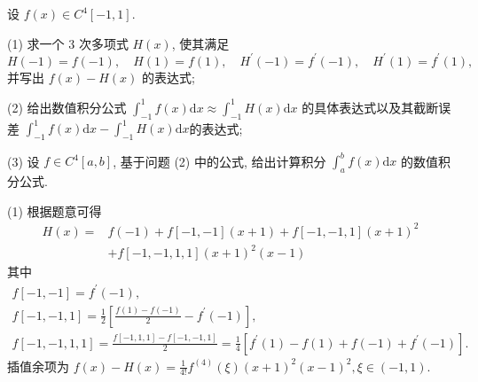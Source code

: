 \begin{tcolorbox}[enhanced,colback=10,colframe=9,breakable,coltitle=green!25!black,title=2024]
设 $ f(x) \in C^{4}[-1,1] $.

(1) 求一个 3 次多项式 $ H(x) $, 使其满足
$$
H(-1)=f(-1), \quad H(1)=f(1), \quad H^{\prime}(-1)=f^{\prime}(-1), \quad H^{\prime}(1)=f^{\prime}(1),
$$
并写出 $ f(x)-H(x) $ 的表达式;

(2) 给出数值积分公式 $\displaystyle\int_{-1}^{1} f(x) \mathrm{d} x \approx \int_{-1}^{1} H(x) \mathrm{d} x $ 的具体表达式以及其截断误差
$\displaystyle\int_{-1}^{1} f(x) \mathrm{d} x-\int_{-1}^{1} H(x) \mathrm{d} x$的表达式;

(3) 设 $ f \in C^{4}[a, b] $, 基于问题 (2) 中的公式, 给出计算积分 $ \int_{a}^{b} f(x) \mathrm{d} x $ 的数值积分公式.
\tcblower

(1) 根据题意可得
$$
\begin{aligned}
H(x)= & f(-1)+f[-1,-1](x+1)+f[-1,-1,1](x+1)^{2} \\
& +f[-1,-1,1,1](x+1)^{2}(x-1)
\end{aligned}
$$
其中
$$
\begin{array}{c}
f[-1,-1]=f^{\prime}(-1), \\
f[-1,-1,1]=\frac{1}{2}\left[\frac{f(1)-f(-1)}{2}-f^{\prime}(-1)\right], \\
f[-1,-1,1,1]=\frac{f[-1,1,1]-f[-1,-1,1]}{2}=\frac{1}{4}\left[f^{\prime}(1)-f(1)+f(-1)+f^{\prime}(-1)\right] .
\end{array}
$$
插值余项为 $ f(x)-H(x)=\frac{1}{4!} f^{(4)}(\xi)(x+1)^{2}(x-1)^{2}, \xi \in(-1,1) $.


\end{tcolorbox}
